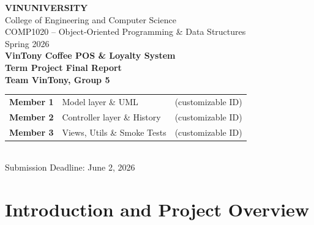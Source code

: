 \documentclass[11pt,a4paper]{article}
\begin{document}
\begin{center}
    \vspace*{0.5cm}
    {\large \bfseries VINUNIVERSITY} \\
    {\large College of Engineering and Computer Science} \\
    \vspace{0.4cm}
    {\large COMP1020 -- Object-Oriented Programming \& Data Structures} \\
    \vspace{0.1cm}
    {\large Spring 2026} \\
    \vspace{1.5cm}
    {\LARGE \bfseries VinTony Coffee POS \& Loyalty System} \\
    \vspace{0.5cm}
    {\large \textbf{Term Project Final Report}} \\
    \vspace{1.5cm}
    \textbf{Team VinTony, Group 5} \\
    \vspace{0.2cm}
    \begin{tabular}{lll}
        \textbf{Member 1} & Model layer \& UML & (customizable ID) \\
        \textbf{Member 2} & Controller layer \& History & (customizable ID) \\
        \textbf{Member 3} & Views, Utils \& Smoke Tests & (customizable ID) \\
    \end{tabular} \\
    \vspace{1.5cm}
    Submission Deadline: June 2, 2026 \\
\end{center}

\newpage

\tableofcontents
\newpage

\section{Introduction and Project Overview}
\end{document}
